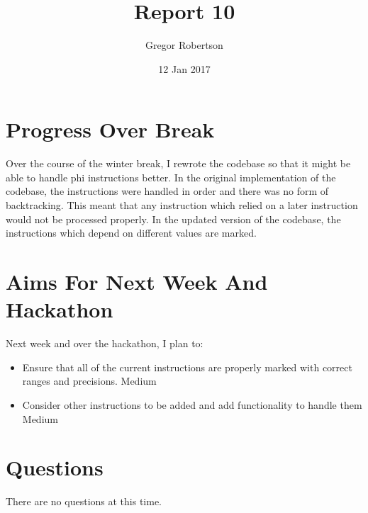 \documentclass{article}
\title{Report 10}
\author{Gregor Robertson}
\date{12 Jan 2017}
\begin{document}
 
\maketitle
 
\section*{Progress Over Break}
Over the course of the winter break, I rewrote the codebase so that it might be able to handle phi instructions better. In the original implementation of the codebase, the instructions were handled in order and there was no form of backtracking. This meant that any instruction which relied on a later instruction would not be processed properly. In the updated version of the codebase, the instructions which depend on different values are marked. 

\section*{Aims For Next Week And Hackathon}
Next week and over the hackathon, I plan to:
\begin{itemize}
	\item Ensure that all of the current instructions are properly marked with correct ranges and precisions. \colorbox{BurntOrange}{\color{Black}Medium}
	\item Consider other instructions to be added and add functionality to handle them \colorbox{BurntOrange}{\color{Black}Medium}
\end{itemize}

\section*{Questions}
There are no questions at this time.

\medskip
 
\printbibliography
\end{document}

